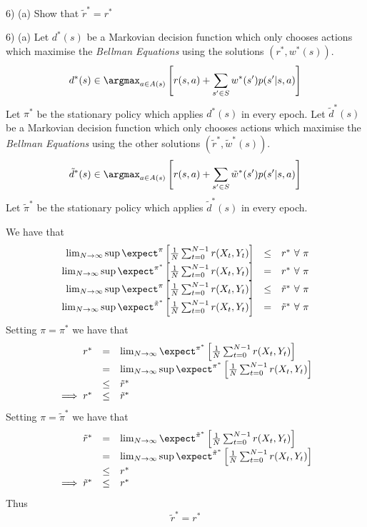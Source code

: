 \documentclass[11pt,a4paper]{article}
\begin{document}
\begin{question}{6) (a)}
  Show that $\tilde{r}^*=r^*$
\end{question}

\begin{answer}{6) (a)}
  Let $d^*(s)$ be a Markovian decision function which only chooses actions which maximise the \textit{Bellman Equations} using the solutions $(r^*,w^*(s))$.
  \[ d^*(s)\in\argmax_{a\in A(s)}\left[r(s,a)+\sum_{s'\in S}w^*(s')p(s'|s,a)\right] \]
  Let $\pi^*$ be the stationary policy which applies $d^*(s)$ in every epoch.
  Let $\tilde{d}^*(s)$ be a Markovian decision function which only chooses actions which maximise the \textit{Bellman Equations} using the other solutions $(\tilde{r}^*,\tilde{w}^*(s))$.
  \[ \tilde{d}^*(s)\in\argmax_{a\in A(s)}\left[r(s,a)+\sum_{s'\in S}\tilde{w}^*(s')p(s'|s,a)\right] \]
  Let $\tilde\pi^*$ be the stationary policy which applies $\tilde{d}^*(s)$ in every epoch.
  \par We have that
  \[\begin{array}{rcl}
    \lim_{N\to\infty}\sup\expect^\pi\left[\frac1N\sum_{t=0}^{N-1}r(X_t,Y_t)\right]&\leq&r^*\ \forall\ \pi\\
    \lim_{N\to\infty}\sup\expect^{\pi^*}\left[\frac1N\sum_{t=0}^{N-1}r(X_t,Y_t)\right]&=&r^*\ \forall\ \pi\\
    \lim_{N\to\infty}\sup\expect^\pi\left[\frac1N\sum_{t=0}^{N-1}r(X_t,Y_t)\right]&\leq&\tilde{r}^*\ \forall\ \pi\\
    \lim_{N\to\infty}\sup\expect^{\tilde\pi^*}\left[\frac1N\sum_{t=0}^{N-1}r(X_t,Y_t)\right]&=&\tilde{r}^*\ \forall\ \pi
  \end{array}\]
  Setting $\pi=\pi^*$ we have that
  \[\begin{array}{rcl}
    r^*&=&\lim_{N\to\infty}\expect^{\pi^*}\left[\frac1N\sum_{t=0}^{N-1}r(X_t,Y_t)\right]\\
    &=&\lim_{N\to\infty}\sup\expect^{\pi^*}\left[\frac1N\sum_{t=0}^{N-1}r(X_t,Y_t)\right]\\
    &\leq&\tilde{r}^*\\
    \implies r^*&\leq&\tilde{r}^*
  \end{array}\]
  Setting $\pi=\tilde\pi^*$ we have that
  \[\begin{array}{rcl}
    \tilde{r}^*&=&\lim_{N\to\infty}\expect^{\tilde\pi^*}\left[\frac1N\sum_{t=0}^{N-1}r(X_t,Y_t)\right]\\
    &=&\lim_{N\to\infty}\sup\expect^{\tilde\pi^*}\left[\frac1N\sum_{t=0}^{N-1}r(X_t,Y_t)\right]\\
    &\leq&r^*\\
    \implies \tilde{r}^*&\leq&r^*
  \end{array}\]
  Thus
  \[ \tilde{r}^*=r^* \]
\end{answer}
\end{document}
